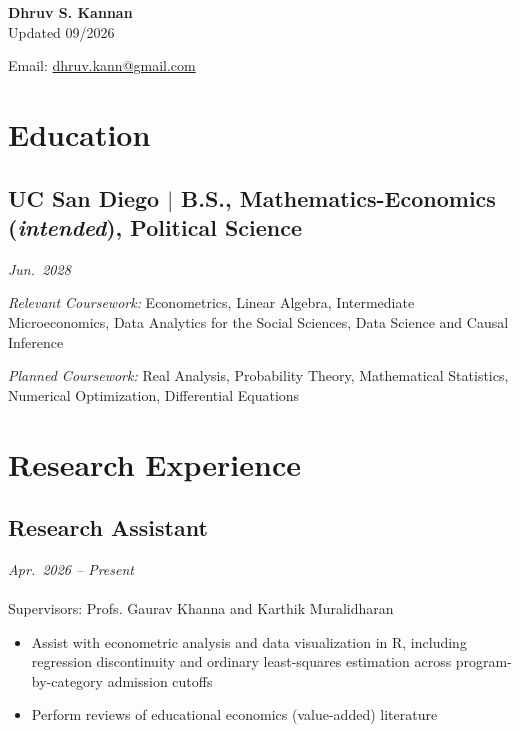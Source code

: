 \documentclass[11pt]{article}
\begin{document}
\begin{center}
	\begin{minipage}{0.5\textwidth}
		{\Huge\bfseries
			Dhruv S. Kannan
		} \\ \medskip
		Updated 09/2026
	\end{minipage} \hfill
	\begin{minipage}{0.4\textwidth}
		\raggedleft
		Email: \href{mailto:dhruv.kann@gmail.com}{dhruv.kann@gmail.com}
	\end{minipage}
\end{center}

\section{Education}
\subsection{UC San Diego \texorpdfstring{$|$}{|} B.S., Mathematics-Economics (\textit{intended}), Political Science}
\noindent\textit{Jun.\ 2028}

\medskip
\noindent \textit{Relevant Coursework:} Econometrics, Linear Algebra, Intermediate Microeconomics, Data Analytics for the Social Sciences, Data Science and Causal Inference \smallskip

\noindent \textit{Planned Coursework:} Real Analysis, Probability Theory, Mathematical Statistics, Numerical Optimization, Differential Equations

\section{Research Experience}

\subsection{Research Assistant}
\noindent\textit{Apr.\ 2026 -- Present} \\
 \\
\noindent Supervisors: Profs. Gaurav Khanna and Karthik Muralidharan
\begin{itemize}
\item Assist with econometric analysis and data visualization in R, including regression discontinuity and ordinary least-squares estimation across program-by-category admission cutoffs
\item Perform reviews of educational economics (value-added) literature
\end{itemize}
\end{document}

